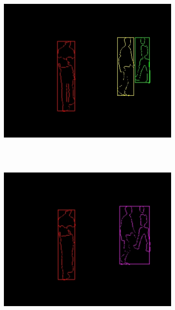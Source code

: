 \begin{figure}[t]
        \centering
        \begin{subfigure}[b]{0.32\textwidth}
                \centering
                \includegraphics[width=\textwidth]{fig1.jpg}
                \caption{~}
                \label{fig:cp02_cluster1}
        \end{subfigure}%
        ~ %
        \begin{subfigure}[b]{0.32\textwidth}
                \centering
                \includegraphics[width=\textwidth]{fig2.jpg}

\end{subfigure}
\end{figure}
